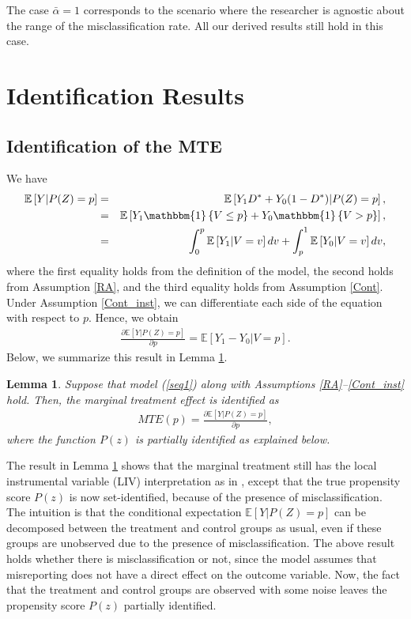 \documentclass[11pt,reqno]{amsart}
\theoremstyle{plain}
\newtheorem{lemma}{Lemma}
\numberwithin{equation}{section}
\begin{document}
The case $\bar{\alpha}=1$ corresponds to the scenario where the researcher is agnostic about the range of the misclassification rate. All our derived results still hold in this case. 

\section{Identification Results}\label{Ident}
\subsection{Identification of the MTE} 
We have
\begin{eqnarray}
\mathbb E\left[Y\vert P(Z)=p\right] &=& \mathbb E\left[Y_1 D^* + Y_0 (1-D^*) \vert P(Z)=p\right], \nonumber \\
&=& \mathbb E\left[Y_1 \mathbbm{1}\left\{V \leq p\right\} + Y_0 \mathbbm{1}\left\{V > p\right\}\right], \nonumber \\
&=& \int^{p}_0\mathbb E\left[Y_1 \vert V=v\right]dv + \int_{p}^1\mathbb E\left[Y_0 \vert V=v\right]dv, \label{eq:mte}
\end{eqnarray}
where the first equality holds from the definition of the model, the second holds from Assumption \ref{RA}, and the third equality holds from Assumption \ref{Cont}. 
Under Assumption \ref{Cont_inst}, we can differentiate each side of the equation with respect to $p$. Hence, we obtain
\begin{eqnarray*}
\frac{\partial \mathbb E[Y \vert P(Z)=p] }{\partial p}= \mathbb E\left[Y_1 - Y_0 \vert V=p\right].
\end{eqnarray*}
Below, we summarize this result in Lemma \ref{thm1}.
\begin{lemma}\label{thm1}
Suppose that model (\ref{seq1}) along with Assumptions \ref{RA}--\ref{Cont_inst} hold. Then, the marginal treatment effect is identified as 
\begin{eqnarray*}
MTE(p)= \frac{\partial \mathbb E[Y \vert P(Z)=p] }{\partial p},
\end{eqnarray*}
where the function $P(z)$ is partially identified as explained below.
\end{lemma}
The result in Lemma \ref{thm1} shows that the marginal treatment still has the local instrumental variable (LIV) interpretation as in \cite{heckman1999,heckman2001,heckman2005structural}, except that the true propensity score $P(z)$ is now set-identified, because of the presence of misclassification. The intuition is that the conditional expectation $\mathbb E[Y\vert P(Z)=p]$ can be decomposed between the treatment and control groups as usual, even if these groups are unobserved due to the presence of misclassification. 
The above result holds whether there is misclassification or not, since the model assumes that misreporting does not have a direct effect on the outcome variable. Now, the fact that the treatment and control groups are observed with some noise leaves the propensity score $P(z)$ partially identified. 
\end{document}
